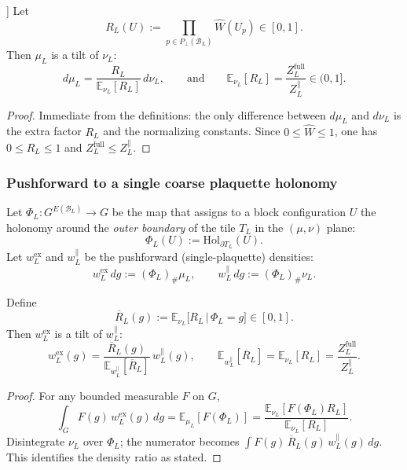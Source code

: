 \begin{lemma}[Local change-of-measure factor is in $[0,1$]]\label{lem:block_tilt_R}
Let
\[
R_L(U):=\prod_{p\in P_{\perp}(\mathcal B_L)} \widehat W(U_p)\in[0,1].
\]
Then $\mu_L$ is a tilt of $\nu_L$:
\begin{equation}\label{eq:block_tilt}
d\mu_L = \frac{R_L}{\mathbb E_{\nu_L}[R_L]}\,d\nu_L,
\qquad\text{and}\qquad
\mathbb E_{\nu_L}[R_L]=\frac{Z_L^{\mathrm{full}}}{Z_L^{\parallel}}\in(0,1].
\end{equation}
\end{lemma}

\begin{proof}
Immediate from the definitions: the only difference between $d\mu_L$ and $d\nu_L$ is the extra factor
$R_L$ and the normalizing constants.
Since $0\le\widehat W\le 1$, one has $0\le R_L\le 1$ and $Z_L^{\mathrm{full}}\le Z_L^{\parallel}$.
\end{proof}

\subsubsection{Pushforward to a single coarse plaquette holonomy}

Let $\Phi_L:G^{E(\mathcal B_L)}\to G$ be the map that assigns to a block configuration $U$
the holonomy around the \emph{outer boundary} of the tile $T_L$ in the $(\mu,\nu)$ plane:
\[
\Phi_L(U):=\mathrm{Hol}_{\partial T_L}(U).
\]
Let $w_L^{\mathrm{ex}}$ and $w_L^{\parallel}$ be the pushforward (single-plaquette) densities:
\[
w_L^{\mathrm{ex}}\,dg := (\Phi_L)_{\#}\mu_L,
\qquad
w_L^{\parallel}\,dg := (\Phi_L)_{\#}\nu_L.
\]

\begin{lemma}\label{lem:marginal_tilt}
Define
\[
\overline R_L(g):=\mathbb E_{\nu_L}\!\bigl[R_L \,\big|\, \Phi_L=g\bigr]\in[0,1].
\]
Then $w_L^{\mathrm{ex}}$ is a tilt of $w_L^{\parallel}$:
\begin{equation}\label{eq:marginal_tilt}
w_L^{\mathrm{ex}}(g)=\frac{\overline R_L(g)}{\mathbb E_{w_L^{\parallel}}[\overline R_L]}\,w_L^{\parallel}(g),
\qquad
\mathbb E_{w_L^{\parallel}}[\overline R_L]=\mathbb E_{\nu_L}[R_L]=\frac{Z_L^{\mathrm{full}}}{Z_L^{\parallel}}.
\end{equation}
\end{lemma}

\begin{proof}
For any bounded measurable $F$ on $G$,
\[
\int_G F(g)\,w_L^{\mathrm{ex}}(g)\,dg
=\mathbb E_{\mu_L}[F(\Phi_L)]
=\frac{\mathbb E_{\nu_L}[F(\Phi_L)R_L]}{\mathbb E_{\nu_L}[R_L]}.
\]
Disintegrate $\nu_L$ over $\Phi_L$; the numerator becomes
$\int F(g)\,\overline R_L(g)\,w_L^{\parallel}(g)\,dg$.
This identifies the density ratio as stated.
\end{proof}

